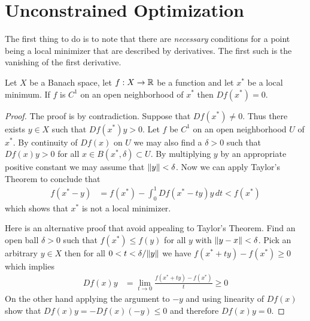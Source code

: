 \section{Unconstrained Optimization}

The first thing to do is to note that there are \emph{necessary}
conditions for a point being a local minimizer that are described by
derivatives.  The first such is the vanishing of the first derivative.

\begin{thm}\label{VanishingFirstDerivativeAtLocalMinimum}Let $X$ be a
  Banach space, let $f : X \to \mathbb{R}$ be a function and let $x^*$ be
  a local minimum.  If $f$ is $C^1$ on an open neighborhood of $x^*$
  then $Df(x^*) = 0$.
\end{thm}
\begin{proof}
The proof is by contradiction.  Suppose that $Df(x^*) \neq 0$.  Thus
there exists $y \in X$ such that $Df(x^*)y > 0$.  Let $f$ be $C^1$ on
an open neighborhood $U$ of $x^*$.  By continuity of $Df(x)$ on $U$ we
may also find a $\delta > 0$ such that $Df(x) y > 0$ for all $x \in
B(x^*, \delta) \subset U$.  By multiplying $y$ by an
appropriate positive constant we may assume that $\lVert y \rVert < \delta$.  Now we can
apply Taylor's Theorem to conclude that 
\begin{align*}
f(x^* - y) &= f(x^*) - \int_0^1 Df(x^*-ty) y \, dt < f(x^*)
\end{align*}
which shows that $x^*$ is not a local minimizer.

Here is an alternative proof that avoid appealing to Taylor's Theorem.
Find an open ball $\delta > 0$ such that $f(x^*) \leq f(y)$
for all $y$ with $\lVert y - x \rVert < \delta$.  Pick an arbitrary $y \in X$
then for all $0 < t < \delta/\lVert y \rVert$ we have $f(x^* + t y) - f(x^*)
\geq 0$ which implies 
\begin{align*}
Df(x) y &= \lim_{t \to 0} \frac{f(x^* + ty) - f(x^*)}{t} \geq 0
\end{align*}
On the other hand applying the argument to $-y$ and using linearity of
$Df(x)$ show that $Df(x) y = -Df(x) (-y) \leq 0$ and therefore $Df(x)y
= 0$.
\end{proof}

